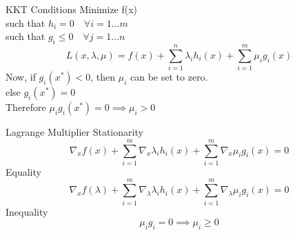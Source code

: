 \documentclass{beamer}
\begin{document}
\begin{frame}{KKT Conditions}
    Minimize f(x)\\
    such that $h_{i} = 0 \hspace{1em} \forall i = 1 \dots m$\\
    such that $g_{i} \leq 0 \hspace{1em} \forall j = 1 \dots n$\\
    
    \begin{equation*}
        L(x,\lambda,\mu)= f(x) + \sum_{i=1}^{n}\lambda_{i}h_{i}(x) + 
        \sum_{i=1}^{m}\mu_{i}g_{i}(x) 
    \end{equation*}
    Now, if $g_{i}(x^{*})<0$, then $\mu_{i}$ can be set to zero.\\
    else  $g_{i}(x^{*})=0$\\
    Therefore $\mu_{i}g_{i}(x^{*})=0 \implies \mu_{i}>0$
\end{frame}


\begin{frame}{Lagrange Multiplier}
    Stationarity\\
    \begin{equation*}
        \nabla_{x}f(x) + \sum_{i=1}^{m} \nabla_{x}\lambda_{i}h_{i}(x)+\sum_{i=1}^{m}\nabla_{x}\mu_{i}g_{i}(x)=0
    \end{equation*}
    Equality
    \begin{equation*}
        \nabla_{x}f(\lambda) + \sum_{i=1}^{m} \nabla_{\lambda}\lambda_{i}h_{i}(x)+\sum_{i=1}^{m}\nabla_{\lambda}\mu_{i}g_{i}(x)=0
    \end{equation*}
    Inequality
    \begin{equation*}
        \mu_{i}g_{i}=0 \implies \mu_{i} \geq 0
    \end{equation*}
\end{frame}
\end{document}
